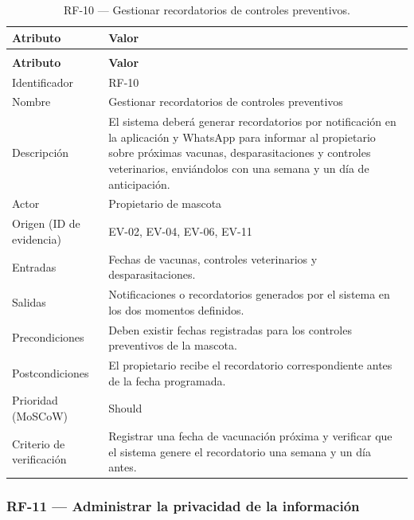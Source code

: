 \documentclass[journal,onecolumn]{IEEEtran}
\makeatletter
\newenvironment{atributos}[2]{%
	\small
	\begin{longtable}{@{}>{\raggedright\arraybackslash}p{4.2cm} >{\raggedright\arraybackslash}p{11.2cm}@{}}
		\caption{#2}\label{tab:#1}\\
		\toprule
		\textbf{Atributo} & \textbf{Valor} \\
		\midrule
		\endfirsthead
		\multicolumn{2}{@{}l}{\small\itshape (continuación)}\\
		\toprule
		\textbf{Atributo} & \textbf{Valor} \\
		\midrule
		\endhead
		\bottomrule
		\endlastfoot
	}{%
	\end{longtable}
	\normalsize
}
\makeatother
\begin{document}
	\begin{atributos}{RF-10}{RF-10 --- Gestionar recordatorios de controles preventivos.}
		Identificador & RF-10 \\
		Nombre & Gestionar recordatorios de controles preventivos \\
		Descripción & El sistema deberá generar recordatorios por notificación en la aplicación y WhatsApp para informar al propietario sobre próximas vacunas, desparasitaciones y controles veterinarios, enviándolos con una semana y un día de anticipación. \\
		Actor & Propietario de mascota \\
		Origen (ID de evidencia) & EV-02, EV-04, EV-06, EV-11 \\
		Entradas & Fechas de vacunas, controles veterinarios y desparasitaciones. \\
		Salidas & Notificaciones o recordatorios generados por el sistema en los dos momentos definidos. \\
		Precondiciones & Deben existir fechas registradas para los controles preventivos de la mascota. \\
		Postcondiciones & El propietario recibe el recordatorio correspondiente antes de la fecha programada. \\
		Prioridad (MoSCoW) & Should \\
		Criterio de verificación & Registrar una fecha de vacunación próxima y verificar que el sistema genere el recordatorio una semana y un día antes. \\
	\end{atributos}
	
	\subsubsection{RF-11 --- Administrar la privacidad de la información}
	
\end{document}
